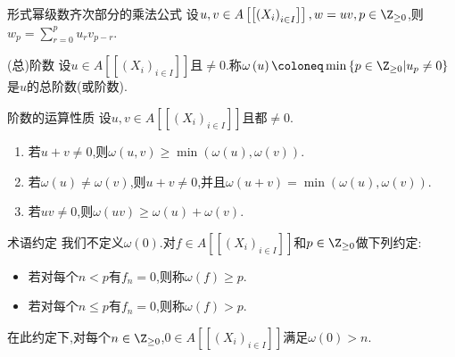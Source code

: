 \begin{proposition}{形式幂级数齐次部分的乘法公式}{}
	设$u,v\in A\left[\left[\left(X_{i}\right)_{i\in I}\right]\right],w=uv,p\in\Z_{\geq 0}$,则$w_{p}=\sum\limits_{r=0}^{p}u_{r}v_{p-r}$.
\end{proposition}

\begin{definition}{(总)阶数}{}
	设$u\in A\left[\left[\left(X_{i}\right)_{i\in I}\right]\right]$且$\neq 0$.称$\omega\left(u\right)\coloneq\min\left\{p\in\Z_{\geq 0}\middle|u_{p}\neq 0\right\}$是$u$的总阶数(或阶数).
\end{definition}

\begin{proposition}{阶数的运算性质}{}
	设$u,v\in A\left[\left[\left(X_{i}\right)_{i\in I}\right]\right]$且都$\neq 0$.
	\begin{enumerate}
		\item 若$u+v\neq 0$,则$\omega\left(u,v\right)\geq\min\left(\omega\left(u\right),\omega\left(v\right)\right)$.
		\item 若$\omega\left(u\right)\neq\omega\left(v\right)$,则$u+v\neq 0$,并且$\omega\left(u+v\right)=\min\left(\omega\left(u\right),\omega\left(v\right)\right)$.
		\item 若$uv\neq 0$,则$\omega\left(uv\right)\geq\omega\left(u\right)+\omega\left(v\right)$.
	\end{enumerate}
\end{proposition}

\begin{remark}{术语约定}{}
	我们不定义$\omega\left(0\right)$.对$f\in A\left[\left[\left(X_{i}\right)_{i\in I}\right]\right]$和$p\in\Z_{\geq 0}$做下列约定:
	\begin{itemize}
		\item 若对每个$n<p$有$f_{n}=0$,则称$\omega\left(f\right)\geq p$.
		\item 若对每个$n\leq p$有$f_{n}=0$,则称$\omega\left(f\right)>p$.
	\end{itemize}
	在此约定下,对每个$n\in\Z_{\geq 0}$,$0\in A\left[\left[\left(X_{i}\right)_{i\in I}\right]\right]$满足$\omega\left(0\right)>n$.
\end{remark}

